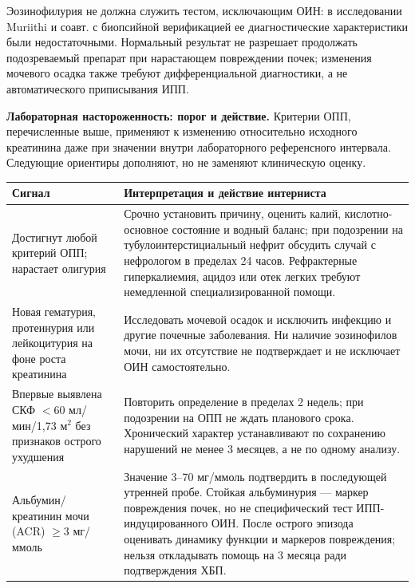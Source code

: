 \documentclass[11pt,a4paper,notitlepage]{report}
\newcommand{\src}[1]{\unskip\space\cite{#1}}
\begin{document}
Эозинофилурия не должна служить тестом, исключающим ОИН: в исследовании Muriithi и соавт. с биопсийной верификацией ее диагностические характеристики были недостаточными. Нормальный результат не разрешает продолжать подозреваемый препарат при нарастающем повреждении почек; изменения мочевого осадка также требуют дифференциальной диагностики, а не автоматического приписывания ИПП.\src{renaleosin2013}

\textbf{Лабораторная настороженность: порог и действие.} Критерии ОПП, перечисленные выше, применяют к изменению относительно исходного креатинина даже при значении внутри лабораторного референсного интервала. Следующие ориентиры дополняют, но не заменяют клиническую оценку.
\begin{longtable}{P{0.31\textwidth}P{0.60\textwidth}}
\toprule
Сигнал & Интерпретация и действие интерниста \\
\midrule
\endhead
Достигнут любой критерий ОПП; нарастает олигурия & Срочно установить причину, оценить калий, кислотно-основное состояние и водный баланс; при подозрении на тубулоинтерстициальный нефрит обсудить случай с нефрологом в пределах 24 часов. Рефрактерные гиперкалиемия, ацидоз или отек легких требуют немедленной специализированной помощи.\src{renalniceaki} \\
Новая гематурия, протеинурия или лейкоцитурия на фоне роста креатинина & Исследовать мочевой осадок и исключить инфекцию и другие почечные заболевания. Ни наличие эозинофилов мочи, ни их отсутствие не подтверждает и не исключает ОИН самостоятельно.\src{renalniceaki,renaleosin2013} \\
Впервые выявлена СКФ $<60$ мл/мин/1,73 м$^2$ без признаков острого ухудшения & Повторить определение в пределах 2 недель; при подозрении на ОПП не ждать планового срока. Хронический характер устанавливают по сохранению нарушений не менее 3 месяцев, а не по одному анализу.\src{renalniceckd,renalniceaki} \\
Альбумин/креатинин мочи (ACR) $\geq3$ мг/ммоль & Значение 3--70 мг/ммоль подтвердить в последующей утренней пробе. Стойкая альбуминурия --- маркер повреждения почек, но не специфический тест ИПП-индуцированного ОИН. После острого эпизода оценивать динамику функции и маркеров повреждения; нельзя откладывать помощь на 3 месяца ради подтверждения ХБП.\src{renalniceckd,renalniceaki} \\
\bottomrule
\end{longtable}
\end{document}
